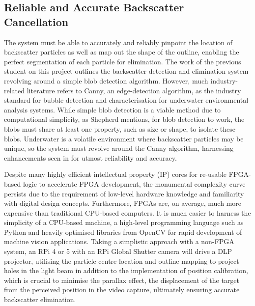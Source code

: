 \subsection{Reliable and Accurate Backscatter Cancellation}
The system must be able to accurately and reliably pinpoint the location of backscatter particles as well as map out the shape of the outline, enabling the perfect segmentation of each particle for elimination. The work of the previous student on this project \cite{katieshepherdMachineVisionBased2023} outlines the backscatter detection and elimination system revolving around a simple blob detection algorithm. However, much industry-related literature refers to Canny, an edge-detection algorithm, as the industry standard for bubble detection and characterisation for underwater environmental analysis systems. While simple blob detection is a viable method due to computational simplicity, as Shepherd mentions, for blob detection to work, the blobs must share at least one property, such as size or shape, to isolate these blobs. Underwater is a volatile environment where backscatter particles may be unique, so the system must revolve around the Canny algorithm, harnessing enhancements seen in \cite{zelenkaGasBubbleShape2014} for utmost reliability and accuracy.

Despite many highly efficient intellectual property (IP) cores for re-usable FPGA-based logic to accelerate FPGA development, the monumental complexity curve persists due to the requirement of low-level hardware knowledge and familiarity with digital design concepts. Furthermore, FPGAs are, on average, much more expensive than traditional CPU-based computers. It is much easier to harness the simplicity of a CPU-based machine, a high-level programming language such as Python and heavily optimised libraries from OpenCV for rapid development of machine vision applications. Taking a simplistic approach with a non-FPGA system, an RPi 4 or 5 with an RPi Global Shutter camera will drive a DLP projector, utilising the particle centre location and outline mapping to project holes in the light beam in addition to the implementation of position calibration, which is crucial to minimise the parallax effect, the displacement of the target from the perceived position in the video capture, ultimately ensuring accurate backscatter elimination.

